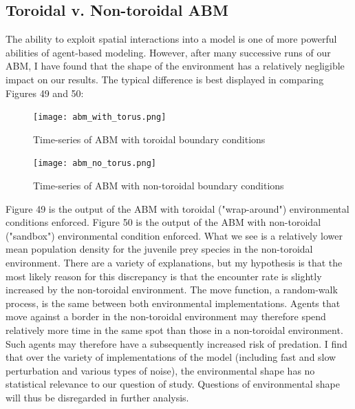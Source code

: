 \documentclass[12pt]{article}
\begin{document}
\subsection{Toroidal v. Non-toroidal ABM}

The ability to exploit spatial interactions into a model is one of more powerful abilities of agent-based modeling. However, after many successive runs of our ABM, I have found that the shape of the environment has a relatively negligible impact on our results. The typical difference is best displayed in comparing Figures 49 and 50:

\begin{figure}[!htb]
\begin{centering}
  \texttt{[image: abm\_with\_torus.png]}
  \caption{Time-series of ABM with toroidal boundary conditions} 
\endminipage\hfill
{}
  \texttt{[image: abm\_no\_torus.png]}
  \caption{Time-series of ABM with non-toroidal boundary conditions}
\endminipage\hfill
\end{centering}
\end{figure}
\FloatBarrier

Figure 49 is the output of the ABM with toroidal ("wrap-around") environmental conditions enforced. Figure 50 is the output of the ABM with non-toroidal ("sandbox") environmental condition enforced. What we see is a relatively lower mean population density for the juvenile prey species in the non-toroidal environment. There are a variety of explanations, but my hypothesis is that the most likely reason for this discrepancy is that the encounter rate is slightly increased by the non-toroidal environment. The move function, a random-walk process, is the same between both environmental implementations. Agents that move against a border in the non-toroidal environment may therefore spend relatively more time in the same spot than those in a non-toroidal environment. Such agents may therefore have a subsequently increased risk of predation. I find that over the variety of implementations of the model (including fast and slow perturbation and various types of noise), the environmental shape has no statistical relevance to our question of study. Questions of environmental shape will thus be disregarded in further analysis.

\end{document}
